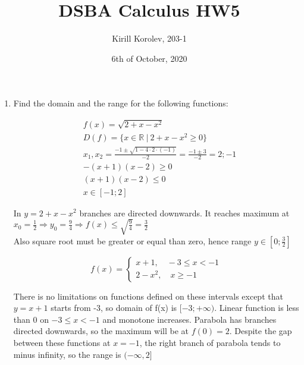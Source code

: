 \documentclass{article}
\title{DSBA Calculus HW5}
\author{Kirill Korolev, 203-1}
\date{6th of October, 2020}
\begin{document}
	
\maketitle

\begin{enumerate}
	\item Find the domain and the range for the following functions:
	
	\begin{align*}
	&f(x) = \sqrt{2 + x - x^2}\\
	&D(f) = \{x \in \mathbb{R} \:|\: 2 + x - x^2 \geq 0\}\\
	&x_1, x_2 = \frac{-1 \pm \sqrt{1 - 4 \cdot 2 \cdot (-1)}}{-2} = \frac{-1 \pm 3}{-2} = 2; -1\\
	&-(x + 1)(x - 2) \geq 0\\
	&(x + 1)(x - 2) \leq 0\\
	&x \in [-1; 2]
	\end{align*}
	
	
	\begin{center}
		In $y = 2 + x - x^2$ branches are directed downwards. It reaches maximum at $x_0 = \frac{1}{2} \Rightarrow y_0 = \frac{9}{4} \Rightarrow f(x) \leq \sqrt{\frac{9}{4}} = \frac{3}{2}$\\
		Also square root must be greater or equal than zero, hence range $y \in [0; \frac{3}{2}]$
	\end{center}

	\begin{equation*}
	f(x) = 
	\begin{cases*}
		x + 1, \quad -3 \leq x < -1\\
		2 - x^2, \quad x \geq -1
	\end{cases*}
	\end{equation*}
	
	
	There is no limitations on functions defined on these intervals except that $y = x + 1$ starts from -3, so domain of f(x) is $[-3; +\infty)$. Linear function is less than 0 on $-3 \leq x < -1$ and monotone increases. Parabola has branches directed downwards, so the maximum will be at $f(0) = 2$. Despite the gap between these functions at $x = -1$, the right branch of parabola tends to minus infinity, so the range is $(-\infty, 2]$


\end{enumerate}
\end{document}
